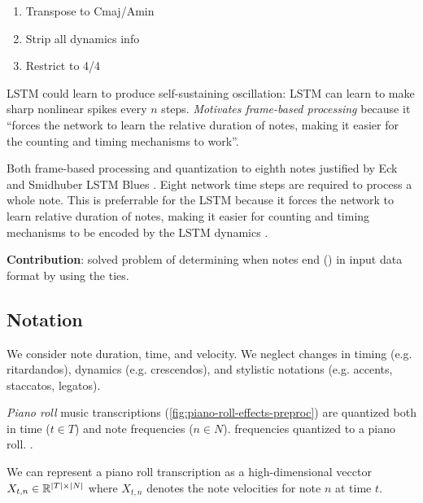 \documentclass[dissertation.tex]{subfiles}
\begin{document}
\begin{enumerate}
    \item Transpose to Cmaj/Amin
    \item Strip all dynamics info
    \item Restrict to 4/4
\end{enumerate}

LSTM could learn to produce self-sustaining oscillation: LSTM can learn to make
sharp nonlinear spikes every $n$ steps. \emph{Motivates frame-based processing}
because it ``forces the network to learn the relative duration of notes, making
it easier for the counting and timing mechanisms to work''\cite{Eck2002}.

Both frame-based processing and quantization to eighth notes justified by Eck
and Smidhuber LSTM Blues . Eight network time steps are required to
process a whole note. This is preferrable for the LSTM because it forces the network to learn
relative duration of notes, making it easier for counting and timing mechanisms
to be encoded by the LSTM dynamics .

\textbf{Contribution}: solved problem of determining when notes end () in input data format by using the ties.


\subsection{Notation}

We consider note duration, time, and velocity. We neglect changes in timing
(e.g. ritardandos), dynamics (e.g. crescendos), and stylistic notations (e.g.
accents, staccatos, legatos).


\emph{Piano roll} music transcriptions
(\autoref{fig:piano-roll-effects-preproc}) are quantized both in time ($t \in
T$) and note frequencies ($n \in N$). frequencies quantized to a piano roll.
.

We can represent a piano roll transcription as a high-dimensional vecctor
$X_{t,n} \in \mathbb{R}^{|T| \times |N|}$ where $X_{t,n}$ denotes the note
velocities for note $n$ at time $t$.

\printbibliography
\end{document}
